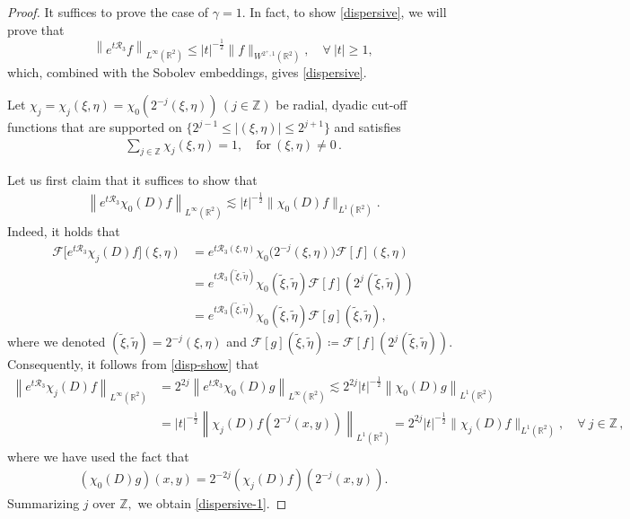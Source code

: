 \documentclass[10pt,a4paper]{amsart}
\def\cF{{\mathcal F}}
\newcommand \tri {\coloneqq}
\newcommand{\beq}{\begin{equation}}
\newcommand{\eeq}{\end{equation}}
\begin{document}
\begin{proof}
	It suffices to prove the case of $\gamma=1.$
	In fact, to show \eqref{dispersive},  we will prove that
	\beq\label{dispersive-1}
	\left\| e^{t\mathcal{R}_3}f \right\|_{L^\infty(\mathbb{R}^2)} \leq |t|^{-\frac{1}{2}} \|f\|_{W^{2^{+},1}(\mathbb{R}^2)}, \quad \forall~ |t|\geq 1,
	\eeq
	which, combined with the Sobolev embeddings, gives \eqref{dispersive}.
	
	Let $\chi_j=\chi_j(\xi, \eta)=\chi_0(2^{-j}(\xi, \eta))\, (j\in \mathbb{Z})$ be radial, dyadic cut-off functions that are supported on $\{2^{j-1}\leq |(\xi,\eta)|\leq 2^{j+1}\}$ and satisfies 
	\begin{align*}
		\sum_{j\in \mathbb{Z}}\chi_j(\xi,\eta)=1, \quad \text{for}~(\xi,\eta)\neq 0\,.
	\end{align*}
	
	Let us first claim that it suffices to show that 
	\begin{align}\label{disp-show}
		\left\| e^{t\mathcal{R}_3}\chi_0(D)f \right\|_{L^\infty(\mathbb{R}^2)} \lesssim |t|^{-\frac{1}{2}} \|\chi_0(D)f\|_{L^1(\mathbb{R}^2)}.
	\end{align}
	Indeed, it holds that 
	\begin{align*}
		\cF\big[e^{t\mathcal{R}_3}\chi_j(D)f\big](\xi,\eta)&=e^{t \mathcal{R}_3(\xi,\eta)}\chi_0\big(2^{-j} (\xi,\eta)\big) \cF[f](\xi,\eta) \\
		&= e^{t \mathcal{R}_3(\tilde{\xi},\tilde{\eta})}\chi_0(\tilde{\xi},\tilde{\eta}) \cF[f](2^{j}(\tilde{\xi},\tilde{\eta}))
        \\
        &=e^{t \mathcal{R}_3(\tilde{\xi},\tilde{\eta})}\chi_0(\tilde{\xi},\tilde{\eta}) \cF[g](\tilde{\xi},\tilde{\eta}),
	\end{align*}
	where we denoted $(\tilde{\xi}, \tilde{\eta})=2^{-j}(\xi,\eta)$ and $\cF[g](\tilde{\xi},\tilde{\eta})\tri \cF[f](2^{j}(\tilde{\xi},\tilde{\eta}))$.
	Consequently, it follows from \eqref{disp-show} that
	\begin{align}\label{dispes-pj}
		\left\| e^{t\mathcal{R}_3}\chi_j(D)f \right\|_{L^\infty(\mathbb{R}^2)} 
        &=2^{2j}\left\| e^{t\mathcal{R}_3}\chi_0(D)g \right\|_{L^\infty(\mathbb{R}^2)} 
        \lesssim 2^{2j}|t|^{-\frac{1}{2}} \left\| \chi_0(D)g \right\|_{L^1(\mathbb{R}^2)} 
        \nonumber
        \\
        &=|t|^{-\frac{1}{2}} \left\| \chi_j(D)f(2^{-j}(x,y))\right\|_{L^1(\mathbb{R}^2)} 
        =
        2^{2j}|t|^{-\frac{1}{2}} \|\chi_j(D)f\|_{L^1(\mathbb{R}^2)}, \quad \forall~ j\in \mathbb{Z}\, ,
	\end{align}
    where we have used the fact that
    \begin{align*}
        (\chi_0(D)g) (x,y)=2^{-2j}(\chi_j(D) f)(2^{-j}(x,y)).
    \end{align*}
	Summarizing $j$ over $\mathbb{Z},$ we obtain 
	\eqref{dispersive-1}.
	

\end{proof}
\end{document}
